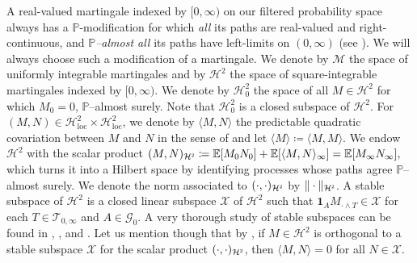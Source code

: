 \documentclass[10pt]{article} %
\newcommand\cG{\mathcal G}
\newcommand\cH{\mathcal H}
\newcommand\cM{\mathcal M}
\newcommand\cT{\mathcal T}
\newcommand\cX{\mathcal X}
\newcommand{\smalltext}[1]{\text{\fontsize{4}{4}\selectfont$#1$}}
\def \E{\mathbb{E}}
\def \P{\mathbb{P}}
\begin{document}
\medskip
A real-valued martingale indexed by $[0,\infty)$ on our filtered probability space always has a $\P$-modification for which \emph{all} its paths are real-valued and right-continuous, and \emph{$\P$--almost all} its paths have left-limits on $(0,\infty)$ (see \citeauthor*{weizsaecker1990stochastic} \cite[Theorem 3.2.6]{weizsaecker1990stochastic}).  We will always choose such a modification of a martingale. We denote by $\cM$ the space of uniformly integrable martingales and by $\cH^2$ the space of square-integrable martingales indexed by $[0,\infty)$. We denote by $\cH^2_0$ the space of all $M \in \cH^2$ for which $M_0 = 0$, $\P$--almost surely. Note that $\cH^2_0$ is a closed subspace of $\cH^2$. For $(M,N) \in \cH^2_\mathrm{loc} \times \cH^2_\mathrm{loc}$, we denote by $\langle M, N \rangle$ the predictable quadratic covariation between $M$ and $N$ in the sense of \cite[Theorem I.4.2]{jacod2003limit} and let $\langle M \rangle \coloneqq \langle M,M \rangle$. We endow $\cH^2$ with the scalar product $( M , N )_{\cH^{\smalltext{2}}} \coloneqq \E[M_0N_0] + \E[\langle M, N \rangle_\infty] = \E[M_\infty N_\infty],$ which turns it into a Hilbert space by identifying processes whose paths agree $\P$--almost surely. We denote the norm associated to $(\cdot,\cdot)_{\cH^\smalltext{2}}$ by $\|\cdot\|_{\cH^\smalltext{2}}$. A stable subspace of $\cH^2$ is a closed linear subspace $\cX$ of $\cH^2$ such that $\mathbf{1}_A M_{\cdot \land T} \in \cX$ for each $T \in \cT_{0,\infty}$ and $A \in \cG_0$. A very thorough study of stable subspaces can be found in \citeauthor*{cohen2015stochastic} \cite{cohen2015stochastic}, \citeauthor*{jacod1979calcul} \cite{jacod1979calcul}, and \citeauthor*{protter2005stochastic} \cite{protter2005stochastic}. Let us mention though that by \cite[Proposition 4.26]{jacod1979calcul}, if $M \in \cH^2$ is orthogonal to a stable subspace $\cX$ for the scalar product $(\cdot,\cdot)_{\cH^\smalltext{2}}$, then $\langle M,N\rangle = 0$ for all $N \in \cX$. 
\end{document}
